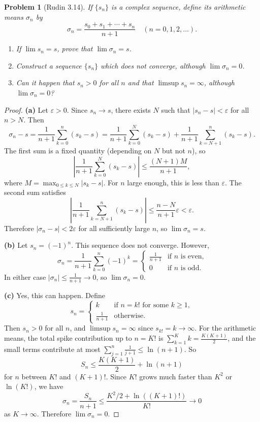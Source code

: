 \documentclass[12 pt]{article}        	%
\newtheorem{prob}{Problem}
\begin{document}
\begin{prob}[Rudin 3.14]
If $\{s_n\}$ is a complex sequence, define its arithmetic means $\sigma_n$ by
\[
\sigma_n = \frac{s_0 + s_1 + \cdots + s_n}{n+1} \quad (n = 0, 1, 2, \ldots).
\]
\begin{enumerate}
    \item[(a)] If $\lim s_n = s$, prove that $\lim \sigma_n = s$.
    \item[(b)] Construct a sequence $\{s_n\}$ which does not converge, although $\lim \sigma_n = 0$.
    \item[(c)] Can it happen that $s_n > 0$ for all $n$ and that $\limsup s_n = \infty$, although $\lim \sigma_n = 0$?
\end{enumerate}
\end{prob}
\begin{proof}
\textbf{(a)} Let $\varepsilon > 0$. Since $s_n \to s$, there exists $N$ such that $|s_n - s| < \varepsilon$ for all $n > N$. Then
\[
\sigma_n - s = \frac{1}{n+1}\sum_{k=0}^{n}(s_k - s) = \frac{1}{n+1}\sum_{k=0}^{N}(s_k - s) + \frac{1}{n+1}\sum_{k=N+1}^{n}(s_k - s).
\]
The first sum is a fixed quantity (depending on $N$ but not $n$), so
\[
\left|\frac{1}{n+1}\sum_{k=0}^{N}(s_k - s)\right| \leq \frac{(N+1)M}{n+1},
\]
where $M = \max_{0 \leq k \leq N}|s_k - s|$. For $n$ large enough, this is less than $\varepsilon$. The second sum satisfies
\[
\left|\frac{1}{n+1}\sum_{k=N+1}^{n}(s_k - s)\right| \leq \frac{n - N}{n+1}\varepsilon < \varepsilon.
\]
Therefore $|\sigma_n - s| < 2\varepsilon$ for all sufficiently large $n$, so $\lim \sigma_n = s$.

\textbf{(b)} Let $s_n = (-1)^n$. This sequence does not converge. However,
\[
\sigma_n = \frac{1}{n+1}\sum_{k=0}^{n}(-1)^k = \begin{cases} \frac{1}{n+1} & \text{if } n \text{ is even,} \\ 0 & \text{if } n \text{ is odd.} \end{cases}
\]
In either case $|\sigma_n| \leq \frac{1}{n+1} \to 0$, so $\lim \sigma_n = 0$.

\textbf{(c)} Yes, this can happen. Define
\[
s_n = \begin{cases} k & \text{if } n = k! \text{ for some } k \geq 1, \\ \frac{1}{n+1} & \text{otherwise.} \end{cases}
\]
Then $s_n > 0$ for all $n$, and $\limsup s_n = \infty$ since $s_{k!} = k \to \infty$. For the arithmetic means, the total spike contribution up to $n = K!$ is $\sum_{k=1}^{K} k = \frac{K(K+1)}{2}$, and the small terms contribute at most $\sum_{j=1}^{n}\frac{1}{j+1} \leq \ln(n+1)$. So
\[
S_n \leq \frac{K(K+1)}{2} + \ln(n+1)
\]
for $n$ between $K!$ and $(K+1)!$. Since $K!$ grows much faster than $K^2$ or $\ln(K!)$, we have
\[
\sigma_n = \frac{S_n}{n+1} \leq \frac{K^2/2 + \ln((K+1)!)}{K!} \to 0
\]
as $K \to \infty$. Therefore $\lim \sigma_n = 0$.
\end{proof}
\end{document}
